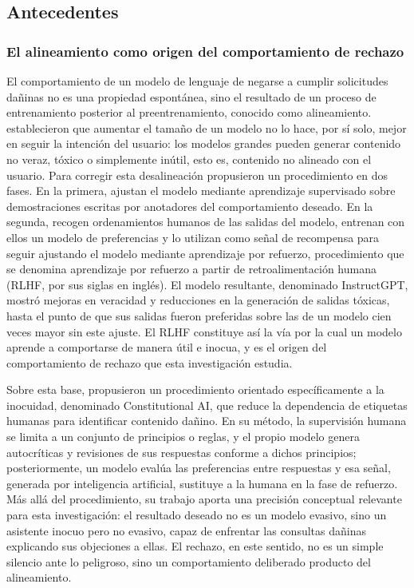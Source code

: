 \documentclass[12pt,a4paper]{article}
\newcommand{\textcite}[1]{\citet{#1}}
\begin{document}
\subsection{Antecedentes}

\subsubsection*{El alineamiento como origen del comportamiento de rechazo}

\justifying

El comportamiento de un modelo de lenguaje de negarse a cumplir solicitudes dañinas no es una propiedad espontánea, sino el resultado de un proceso de entrenamiento posterior al preentrenamiento, conocido como alineamiento. \textcite{ouyang2022} establecieron que aumentar el tamaño de un modelo no lo hace, por sí solo, mejor en seguir la intención del usuario: los modelos grandes pueden generar contenido no veraz, tóxico o simplemente inútil, esto es, contenido no alineado con el usuario. Para corregir esta desalineación propusieron un procedimiento en dos fases. En la primera, ajustan el modelo mediante aprendizaje supervisado sobre demostraciones escritas por anotadores del comportamiento deseado. En la segunda, recogen ordenamientos humanos de las salidas del modelo, entrenan con ellos un modelo de preferencias y lo utilizan como señal de recompensa para seguir ajustando el modelo mediante aprendizaje por refuerzo, procedimiento que se denomina aprendizaje por refuerzo a partir de retroalimentación humana (RLHF, por sus siglas en inglés). El modelo resultante, denominado InstructGPT, mostró mejoras en veracidad y reducciones en la generación de salidas tóxicas, hasta el punto de que sus salidas fueron preferidas sobre las de un modelo cien veces mayor sin este ajuste. El RLHF constituye así la vía por la cual un modelo aprende a comportarse de manera útil e inocua, y es el origen del comportamiento de rechazo que esta investigación estudia.

Sobre esta base, \textcite{bai2022} propusieron un procedimiento orientado específicamente a la inocuidad, denominado Constitutional AI, que reduce la dependencia de etiquetas humanas para identificar contenido dañino. En su método, la supervisión humana se limita a un conjunto de principios o reglas, y el propio modelo genera autocríticas y revisiones de sus respuestas conforme a dichos principios; posteriormente, un modelo evalúa las preferencias entre respuestas y esa señal, generada por inteligencia artificial, sustituye a la humana en la fase de refuerzo. Más allá del procedimiento, su trabajo aporta una precisión conceptual relevante para esta investigación: el resultado deseado no es un modelo evasivo, sino un asistente inocuo pero no evasivo, capaz de enfrentar las consultas dañinas explicando sus objeciones a ellas. El rechazo, en este sentido, no es un simple silencio ante lo peligroso, sino un comportamiento deliberado producto del alineamiento.
\end{document}
